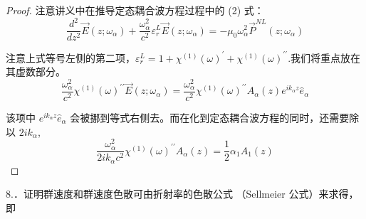\begin{proof}

注意讲义中在推导定态耦合波方程过程中的 (2) 式：
$$
\frac{d^{2}}{d z^{2}} \vec{E}\left(z ; \omega_{\alpha}\right)+\frac{\omega_{\alpha}^{2}}{c^{2}} \varepsilon_{r}^{L} \vec{E}\left(z ; \omega_{\alpha}\right)=-\mu_{0} \omega_{\alpha}^{2} \vec{P}^{N L}\left(z ; \omega_{\alpha}\right)
$$

注意上式等号左侧的第二项，$\varepsilon_{r}^{L}=1+\chi^{(1)}(\omega)^\prime+\chi^{(1)}(\omega)^{\prime\prime}$.我们将重点放在其虚数部分。
$$\frac{\omega_{\alpha}^{2}}{c^{2}} \chi^{(1)}(\omega)^{\prime\prime} \vec{E}\left(z ; \omega_{\alpha}\right)=\frac{\omega_{\alpha}^{2}}{c^{2}} \chi^{(1)}(\omega)^{\prime\prime}  A_\alpha(z)e^{ik_\alpha z}\hat{e}_\alpha$$

该项中 $e^{ik_\alpha z}\hat{e}_\alpha$ 会被挪到等式右侧去。而在化到定态耦合波方程的同时，还需要除以 $2ik_\alpha$, $$\frac{\omega_{\alpha}^{2}}{2ik_\alpha c^{2}} \chi^{(1)}(\omega)^{\prime\prime}  A_\alpha(z)=\frac{1}{2}\alpha_1 A_1(z)$$

\end{proof}

\begin{exercise}

8.．证明群速度和群速度色散可由折射率的色散公式 （Sellmeier 公式）来求得，即
\end{exercise}



